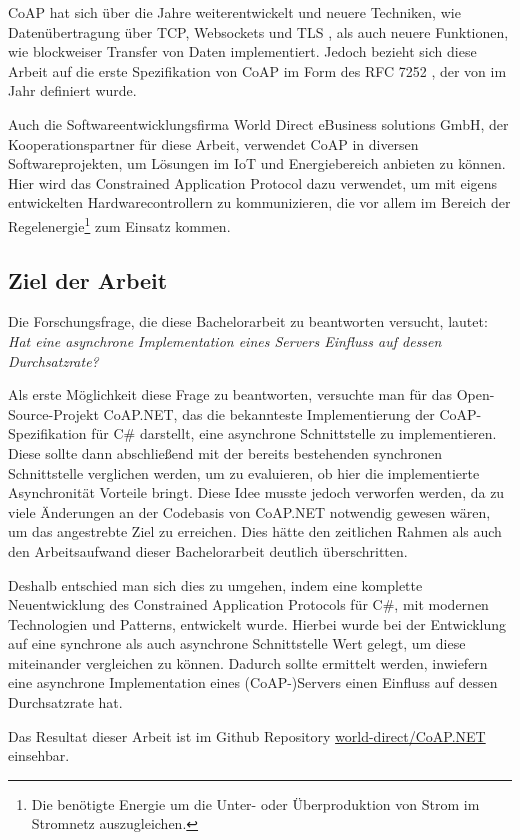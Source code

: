 CoAP hat sich über die Jahre weiterentwickelt und neuere Techniken, wie Datenübertragung über TCP, Websockets und TLS \autocite{RFC8323}, als auch neuere Funktionen, wie blockweiser Transfer von Daten \autocite{RFC7959} implementiert. Jedoch bezieht sich diese Arbeit auf die erste Spezifikation von CoAP im Form des RFC 7252 \autocite{RFC7252}, der von \citeauthor{RFC7252} im Jahr \citeyear{RFC7252} definiert wurde.

Auch die Softwareentwicklungsfirma World Direct eBusiness solutions GmbH, der Kooperationspartner für diese Arbeit, verwendet CoAP in diversen Softwareprojekten, um Lösungen im IoT und Energiebereich anbieten zu können. Hier wird das Constrained Application Protocol dazu verwendet, um mit eigens entwickelten Hardwarecontrollern zu kommunizieren, die vor allem im Bereich der Regelenergie\footnote{Die benötigte Energie um die Unter- oder Überproduktion von Strom im Stromnetz auszugleichen.} zum Einsatz kommen.

\subsection{Ziel der Arbeit}
\label{subsec:ziel-der-arbeit}

Die Forschungsfrage, die diese Bachelorarbeit zu beantworten versucht, lautet: \textit{Hat eine asynchrone Implementation eines Servers Einfluss auf dessen Durchsatzrate?}

Als erste Möglichkeit diese Frage zu beantworten, versuchte man für das Open-Source-Projekt CoAP.NET, das die bekannteste Implementierung der CoAP-Spezifikation für C\# darstellt, eine asynchrone Schnittstelle zu implementieren. Diese sollte dann abschließend mit der bereits bestehenden synchronen Schnittstelle verglichen werden, um zu evaluieren, ob hier die implementierte Asynchronität Vorteile bringt. Diese Idee musste jedoch verworfen werden, da zu viele Änderungen an der Codebasis von CoAP.NET notwendig gewesen wären, um das angestrebte Ziel zu erreichen. Dies hätte den zeitlichen Rahmen als auch den Arbeitsaufwand dieser Bachelorarbeit deutlich überschritten.

Deshalb entschied man sich dies zu umgehen, indem eine komplette Neuentwicklung des Constrained Application Protocols für C\#, mit modernen Technologien und Patterns, entwickelt wurde. Hierbei wurde bei der Entwicklung auf eine synchrone als auch asynchrone Schnittstelle Wert gelegt, um diese miteinander vergleichen zu können. Dadurch sollte ermittelt werden, inwiefern eine asynchrone Implementation eines (CoAP-)Servers einen Einfluss auf dessen Durchsatzrate hat.

Das Resultat dieser Arbeit ist im Github Repository \href{https://github.com/world-direct/CoAP.NET}{world-direct/CoAP.NET} einsehbar.